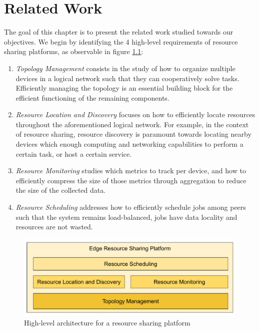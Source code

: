\chapter{Related Work} 
\label{cha:related_work}

The goal of this chapter is to present the related work studied towards our objectives. We begin by identifying the 4 high-level requirements of resource sharing platforms, as observable in figure \ref{fig:proposed_architecture}:

\begin{enumerate}

    \item \textit{Topology Management} consists in the study of how to organize multiple devices in a logical network such that they can cooperatively solve tasks. Efficiently managing the topology is an essential building block for the efficient functioning of the remaining components. 
    
    \item \textit{Resource Location and Discovery} focuses on how to efficiently locate resources throughout the aforementioned logical network. For example, in the context of resource sharing, resource discovery is paramount towards locating nearby devices which enough computing and networking capabilities to perform a certain task, or host a certain service.
    
    \item \textit{Resource Monitoring} studies which metrics to track per device, and how to efficiently compress the size of those metrics through aggregation to reduce the size of the collected data.

    \item \textit{Resource Scheduling} addresses how to efficiently schedule jobs among peers such that the system remains load-balanced, jobs have data locality and resources are not wasted.

\end{enumerate}

\begin{figure}[h]
    \centering
    \includegraphics[width=\linewidth]{Figures/proposed_architecture.pdf}
    \caption{High-level architecture for a resource sharing platform}
    \label{fig:proposed_architecture}
\end{figure}

